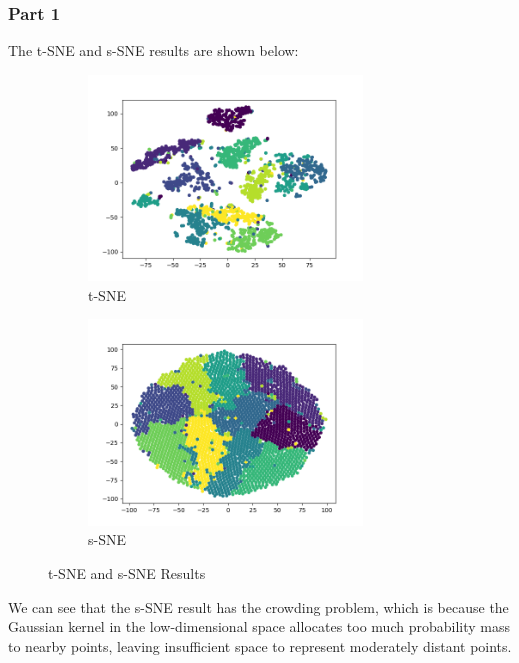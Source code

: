 \documentclass{homework}
\begin{document}
\subsubsection{Part 1}

The t-SNE and s-SNE results are shown below:

\begin{figure}[H]
    \centering
    \begin{subfigure}{0.4\textwidth}
        \centering
        \includegraphics[width=0.8\textwidth]{figures/t-SNE.png}
        \caption{t-SNE}
    \end{subfigure}
    \begin{subfigure}{0.4\textwidth}
        \centering
        \includegraphics[width=0.8\textwidth]{figures/symmetric_SNE.png}
        \caption{s-SNE}
    \end{subfigure}
    \caption{t-SNE and s-SNE Results}
\end{figure}

We can see that the s-SNE result has the crowding problem, which is because the Gaussian kernel in the low-dimensional space allocates too much probability mass to nearby points, leaving insufficient space to represent moderately distant points.
\end{document}
